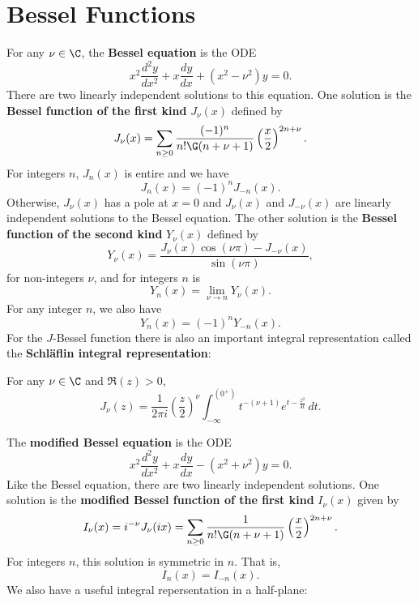   \section{Bessel Functions}\label{append:Bessel_Functions}
    For any $\nu \in \C$, the \textbf{Bessel equation} is the ODE
    \[
      x^{2}\frac{d^{2}y}{dx^{2}}+x\frac{dy}{dx}+(x^{2}-\nu^{2})y = 0.
    \]
    There are two linearly independent solutions to this equation. One solution is the \textbf{Bessel function of the first kind} $J_{\nu}(x)$ defined by
    \[
      J_{\nu}(x) = \sum_{n \ge 0}\frac{(-1)^{n}}{n!\G(n+\nu+1)}\left(\frac{x}{2}\right)^{2n+\nu}.
    \]
    For integers $n$, $J_{n}(x)$ is entire and we have
    \[
      J_{n}(x) = (-1)^{n}J_{-n}(x).
    \]
    Otherwise, $J_{\nu}(x)$ has a pole at $x = 0$ and $J_{\nu}(x)$ and $J_{-\nu}(x)$ are linearly independent solutions to the Bessel equation. The other solution is the \textbf{Bessel function of the second kind} $Y_{\nu}(x)$ defined by
    \[
      Y_{\nu}(x) = \frac{J_{\nu}(x)\cos(\nu\pi)-J_{-\nu}(x)}{\sin(\nu\pi)},
    \]
    for non-integers $\nu$, and for integers $n$ is
    \[
      Y_{n}(x) = \lim_{\nu \to n}Y_{\nu}(x).
    \]
    For any integer $n$, we also have
    \[
      Y_{n}(x) = (-1)^{n}Y_{-n}(x).
    \]
    For the $J$-Bessel function there is also an important integral representation called the \textbf{Schl\"aflin integral representation}:

    \begin{proposition}
      For any $\nu \in \C$ and $\Re(z) > 0$,
      \[
        J_{\nu}(z) = \frac{1}{2\pi i}\left(\frac{z}{2}\right)^{\nu}\int_{-\infty}^{(0^{+})}t^{-(\nu+1)}e^{t-\frac{z^{2}}{4t}}\,dt.
      \]
    \end{proposition}

    The \textbf{modified Bessel equation} is the ODE
    \[
      x^{2}\frac{d^{2}y}{dx^{2}}+x\frac{dy}{dx}-(x^{2}+\nu^{2})y = 0.
    \]
    Like the Bessel equation, there are two linearly independent solutions. One solution is the \textbf{modified Bessel function of the first kind} $I_{\nu}(x)$ given by
    \[
      I_{\nu}(x) = i^{-\nu}J_{\nu}(ix) = \sum_{n \ge 0}\frac{1}{n!\G(n+\nu+1)}\left(\frac{x}{2}\right)^{2n+\nu}.
    \]
    For integers $n$, this solution is symmetric in $n$. That is,
    \[
      I_{n}(x) = I_{-n}(x).
    \]
    We also have a useful integral repersentation in a half-plane:

